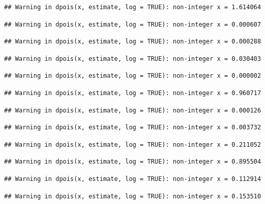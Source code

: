 \documentclass[]{article}
\begin{document}
\begin{verbatim}
## Warning in dpois(x, estimate, log = TRUE): non-integer x = 1.614064
\end{verbatim}

\begin{verbatim}
## Warning in dpois(x, estimate, log = TRUE): non-integer x = 0.000607
\end{verbatim}

\begin{verbatim}
## Warning in dpois(x, estimate, log = TRUE): non-integer x = 0.000288
\end{verbatim}

\begin{verbatim}
## Warning in dpois(x, estimate, log = TRUE): non-integer x = 0.030403
\end{verbatim}

\begin{verbatim}
## Warning in dpois(x, estimate, log = TRUE): non-integer x = 0.000002
\end{verbatim}

\begin{verbatim}
## Warning in dpois(x, estimate, log = TRUE): non-integer x = 0.960717
\end{verbatim}

\begin{verbatim}
## Warning in dpois(x, estimate, log = TRUE): non-integer x = 0.000126
\end{verbatim}

\begin{verbatim}
## Warning in dpois(x, estimate, log = TRUE): non-integer x = 0.003732
\end{verbatim}

\begin{verbatim}
## Warning in dpois(x, estimate, log = TRUE): non-integer x = 0.211052
\end{verbatim}

\begin{verbatim}
## Warning in dpois(x, estimate, log = TRUE): non-integer x = 0.895504
\end{verbatim}

\begin{verbatim}
## Warning in dpois(x, estimate, log = TRUE): non-integer x = 0.112914
\end{verbatim}

\begin{verbatim}
## Warning in dpois(x, estimate, log = TRUE): non-integer x = 0.153510
\end{verbatim}
\end{document}
